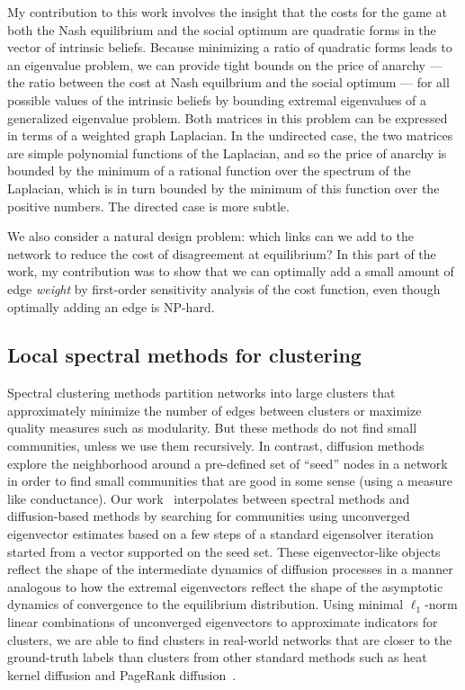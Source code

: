 \documentclass[11pt]{amsart}
\begin{document}
My contribution to this work involves the insight that the costs
for the game at both the Nash equilibrium and the social optimum are
quadratic forms in the vector of intrinsic beliefs.
Because minimizing a ratio of quadratic forms leads to an eigenvalue
problem, we can provide tight bounds on the price of anarchy ---
the ratio between the cost at Nash equilbrium and the social optimum ---
for all possible values of the intrinsic beliefs by bounding extremal
eigenvalues of a generalized eigenvalue problem.
Both matrices in this problem can be expressed in terms of a
weighted graph Laplacian.  In the undirected case, the two matrices are
simple polynomial functions of the Laplacian, and so the price of
anarchy is bounded by the minimum of a rational function over the
spectrum of the Laplacian, which is in turn bounded by the minimum of
this function over the positive numbers.  The directed case is more subtle.

We also consider a natural design problem: which
links can we add to the network to reduce the cost of
disagreement at equilibrium? In this part of the work, my contribution
was to show that we can optimally add a small amount of edge {\em weight}
by first-order sensitivity analysis of the cost function, even though
optimally adding an edge is NP-hard.

\subsection*{Local spectral methods for clustering}

Spectral clustering methods partition networks into large
clusters that approximately minimize the number of edges between
clusters or maximize quality measures such as modularity. But these
methods do not find small communities, unless we use them
recursively.
In contrast, diffusion methods explore the neighborhood around a
pre-defined set of ``seed'' nodes in a network in order to find small
communities that are good in some sense (using a measure like
conductance).  Our work~\cite{2016-losp-kdd,2015-icdm,2015-www}
interpolates between spectral methods and diffusion-based
methods by searching for communities using unconverged eigenvector
estimates based on a few steps of a standard eigensolver iteration
started from a vector supported on the seed set. These eigenvector-like
objects reflect the shape of the intermediate dynamics of diffusion
processes in a manner analogous to how the extremal eigenvectors
reflect the shape of the asymptotic dynamics of
convergence to the equilibrium distribution.  Using minimal
$\ell_1$-norm linear combinations of unconverged eigenvectors
to approximate indicators for clusters, we are able to find
clusters in real-world networks that are closer to the ground-truth
labels than clusters from other standard methods such
as heat kernel diffusion and PageRank
diffusion~\cite{Andersen:2006:PR,Kloumann:2014:Community,Kloster:2014:Heat}.
\end{document}
